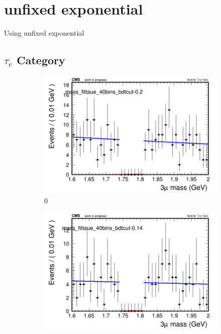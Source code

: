 \section{unfixed exponential}
\label{sec:unfixed_exp}

Using unfixed exponential

\newpage

\subsection{$\tau_{e}$ Category}
\label{sec:taue}

\begin{figure}[h!]
    \centering
    \begin{subfigure}{0.2\textwidth}
        \includegraphics[width=\textwidth]{unfixed_exp/plots/taue/massfit_taue_40bins_bdtcut-0.2.png}
        \caption{0}
    \end{subfigure}
    \begin{subfigure}{0.2\textwidth}
        \includegraphics[width=\textwidth]{unfixed_exp/plots/taue/massfit_taue_40bins_bdtcut-0.14.png}

\end{subfigure}
\end{figure}
